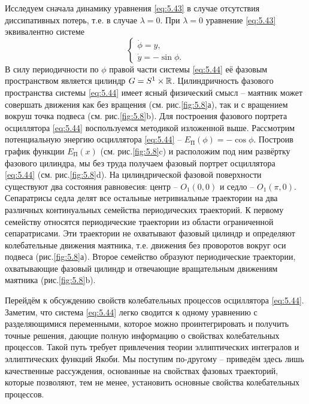 Исследуем сначала динамику уравнения \eqref{eq:5.43} в случае отсутствия диссипативных потерь, т.е. в случае $\lambda=0$. При $\lambda=0$ уравнение \eqref{eq:5.43} эквивалентно системе
\begin{equation}
        \label{eq:5.44}
        \begin{cases}
                \dot \phi = y, \\
                \dot y = - \sin \phi.
        \end{cases}
\end{equation}
В силу периодичности по $\phi$ правой части системы \eqref{eq:5.44} её фазовым пространством является цилиндр $G = S^1 \times \mathbb{R}$. Цилиндричность фазового пространства системы \eqref{eq:5.44} имеет ясный физический смысл -- маятник может совершать движения как без вращения (см. рис.\ref{fig:5.8}а),
так и с вращением вокруш точка подвеса (см. рис.\ref{fig:5.8}b). Для построения фазового портрета осциллятора \eqref{eq:5.44} воспользуемся методикой изложенной выше. Рассмотрим потенциальную энергию осциллятора \eqref{eq:5.44} -- $E_{\text{П}}(\phi) = - \cos \phi$. Построив график функции $E_{\text{П}}(x)$ (см. рис.\ref{fig:5.8}c) и расположим под ним развёртку фазового цилиндра, мы без труда получаем
фазовый портрет осциллятора \eqref{eq:5.44} (см. рис.\ref{fig:5.8}d). На цилиндрической фазовой поверхности существуют два состояния равновесия: центр -- $O_1(0,0)$ и седло -- $O_1(\pi,0)$. Сепаратрисы седла делят все остальные нетривиальные траектории на два различных 
континуальных семейства периодических
траекторий. К первому семейству относятся периодические траектории из
области ограниченной сепаратрисами. Эти траектории не охватывают фазовый
цилиндр и определяют колебательные движения маятника, т.е. движения без
проворотов вокруг оси подвеса (рис.\ref{fig:5.8}а). Второе семейство образуют
периодические траектории, охватывающие фазовый цилиндр и отвечающие
вращательным движениям маятника (рис.\ref{fig:5.8}b).

Перейдём к обсуждению свойств колебательных процессов осциллятора
\eqref{eq:5.44}. Заметим, что система \eqref{eq:5.44} легко сводится к одному уравнению с
разделяющимися переменными, которое можно проинтегрировать и получить
точные решения, дающие полную информацию о свойствах колебательных
процессов. Такой путь требует привлечения теории эллиптических интегралов
и эллиптических функций Якоби. Мы поступим по-другому – приведём здесь
лишь качественные рассуждения, основанные на свойствах фазовых
траекторий, которые позволяют, тем не менее, установить основные свойства
колебательных процессов.

